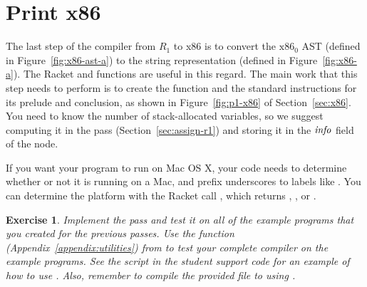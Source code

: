 \documentclass[11pt]{book}
\newtheorem{exercise}[theorem]{Exercise}
\begin{document}
\section{Print x86}
\label{sec:print-x86}

The last step of the compiler from $R_1$ to x86 is to convert the
$\text{x86}_0$ AST (defined in Figure~\ref{fig:x86-ast-a}) to the
string representation (defined in Figure~\ref{fig:x86-a}). The Racket
 and  functions are useful in this
regard. The main work that this step needs to perform is to create the
 function and the standard instructions for its prelude and
conclusion, as shown in Figure~\ref{fig:p1-x86} of
Section~\ref{sec:x86}. You need to know the number of stack-allocated
variables, so we suggest computing it in the  pass
(Section~\ref{sec:assign-r1}) and storing it in the $\mathit{info}$ field
of the  node.




If you want your program to run on Mac OS X, your code needs to
determine whether or not it is running on a Mac, and prefix
underscores to labels like .  You can determine the platform
with the Racket call , which returns
, , or .  

\begin{exercise}
\normalfont Implement the  pass and test it on all of
the example programs that you created for the previous passes. Use the
 function (Appendix~\ref{appendix:utilities}) from
 to test your complete compiler on the example
programs.  See the  script in the student support
code for an example of how to use . Also, remember
to compile the provided  file to  using
.
\end{exercise}
\end{document}
